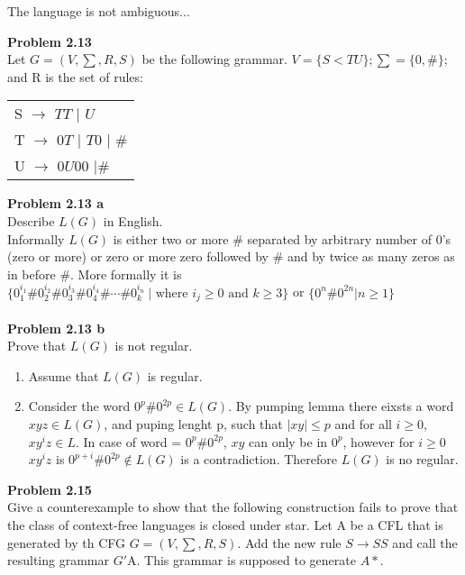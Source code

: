 \documentclass{article}
\newcommand{\problem}[1]{\large{\textbf{Problem #1} \\}}
\begin{document}
The language is not ambiguous... \\

\pagebreak

\problem{2.13}
Let $G = (V, \sum, R, S)$ be the following grammar. $V = \{S<T U\}; \sum = \{0,\#\};$ and R is the set of rules:
\begin{table}[h!]
\centering
\begin{tabular}{l}
S $\rightarrow$ $TT$ $|$ $U$ \\
T $\rightarrow$ $0T$ $|$ $T0$ $|$ $\#$   \\
U $\rightarrow$  $0U00$ $|\#$
\end{tabular}
\end{table}

\vspace{0.2cm}

\problem{2.13 a}
Describe $L(G)$ in English. \\

Informally $L(G)$ is either two or more $\#$ separated by arbitrary number of 0's (zero or more)
or zero or more zero followed by $\#$ and by twice as many zeros as in before $\#$. 
More formally it is $\{0^{i_1}_1\#0^{i_2}_2\#0^{i_3}_3\#0^{i_4}_4\#\cdots\#0^{i_n}_k\ |
\text{ where } i_j \geq 0 \text{ and } k \geq 3 \}$ or $\{0^n \# 0^{2n} | n \geq 1\}$ \\ \\

\problem{2.13 b}
Prove that $L(G)$ is not regular. \\

\begin{enumerate}[Case 1., leftmargin = 1.5cm]
\itemsep0em
\item Assume that $L(G)$ is regular.
\item Consider the word $0^p\#0^{2p} \in L(G)$. By pumping lemma there eixsts a word $xyz \in L(G)$, and puping
lenght p, such that $|xy| \leq p$ and for all $i \geq 0$, $xy^iz \in L$. In case of word = $0^p \# 0^{2p}$, $xy$
can only be in $0^p$, however for $i \geq 0$ $xy^iz$ is $0^{p+i} \# 0^{2p} \notin L(G)$ is a contradiction. Therefore
$L(G)$ is no regular.
\end{enumerate}

\problem{2.15}
Give a counterexample to show that the following construction fails to prove that the class of context-free languages is closed under star.
Let A be a CFL that is generated by th CFG $G = (V,\sum,R,S)$. Add the new rule $S \rightarrow SS$ and call the
resulting grammar $G'$A. This grammar is supposed to generate $A*$. \\
\end{document}

